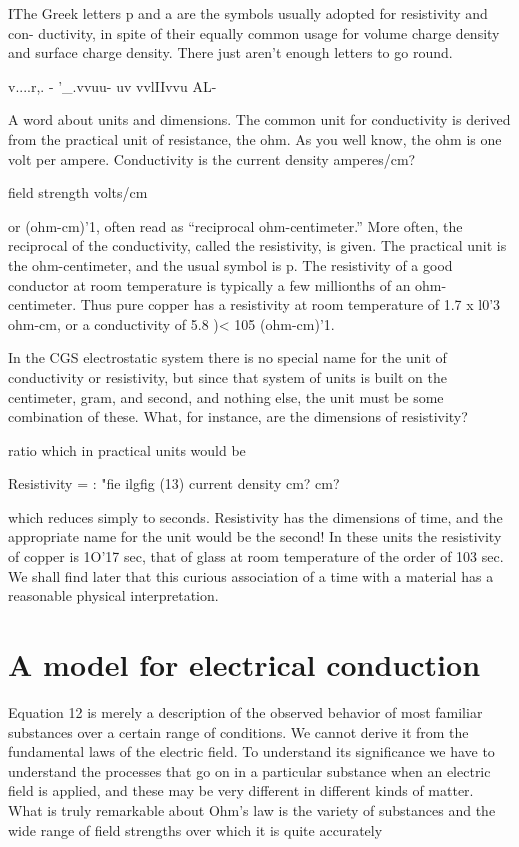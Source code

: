 IThe Greek letters p and a are the symbols usually adopted for resistivity and con-
ductivity, in spite of their equally common usage for volume charge density and surface
charge density. There just aren't enough letters to go round.

v....r,. - '_.vvuu- uv \/vvlI\/Ivvu AL-

A word about units and dimensions. The common unit for conductivity
is derived from the practical unit of resistance, the ohm. As
you well know, the ohm is one volt per ampere. Conductivity is the
current density amperes/cm?

field strength volts/cm

or (ohm-cm)'1, often read as ``reciprocal ohm-centimeter.'' More
often, the reciprocal of the conductivity, called the resistivity, is given.
The practical unit is the ohm-centimeter, and the usual symbol is p.
The resistivity of a good conductor at room temperature is typically
a few millionths of an ohm-centimeter. Thus pure copper has a
resistivity at room temperature of 1.7 x l0'3 ohm-cm, or a conductivity
of 5.8 )< 105 (ohm-cm)'1.

In the CGS electrostatic system there is no special name for the
unit of conductivity or resistivity, but since that system of units is
built on the centimeter, gram, and second, and nothing else, the unit
must be some combination of these. What, for instance, are the
dimensions of resistivity?

ratio which in practical units would be

Resistivity =  : "fie ilgfig (13)
current density cm? cm?
\begin{equation}
\end{equation}

which reduces simply to seconds. Resistivity has the dimensions of
time, and the appropriate name for the unit would be the second!
In these units the resistivity of copper is 1O'17 sec, that of glass at
room temperature of the order of 103 sec. We shall find later that
this curious association of a time with a material has a reasonable
physical interpretation.

\section{A model for electrical conduction}

Equation 12 is merely a description of the observed behavior of
most familiar substances over a certain range of conditions. We
cannot derive it from the fundamental laws of the electric field. To
understand its significance we have to understand the processes that
go on in a particular substance when an electric field is applied, and
these may be very different in different kinds of matter. What is
truly remarkable about Ohm's law is the variety of substances and
the wide range of field strengths over which it is quite accurately

